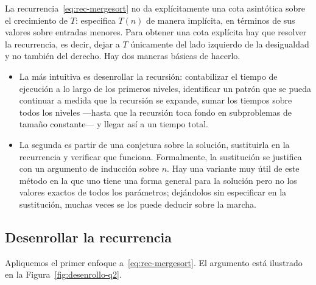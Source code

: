 \documentclass[12pt, spanish, oneside, openany]{book}
\theoremstyle{uprightplain}
\theoremstyle{definition}
\theoremstyle{remark}
\theoremstyle{definition}
\begin{document}
La recurrencia~\eqref{eq:rec-mergesort} no da explícitamente una cota asintótica sobre el crecimiento de $T$: especifica $T(n)$ de manera implícita, en términos de sus valores sobre entradas menores. Para obtener una cota explícita hay que resolver la recurrencia, es decir, dejar a $T$ únicamente del lado izquierdo de la desigualdad y no también del derecho. Hay dos maneras básicas de hacerlo.

\begin{itemize}
    \item La más intuitiva es desenrollar la recursión: contabilizar el tiempo de ejecución a lo largo de los primeros niveles, identificar un patrón que se pueda continuar a medida que la recursión se expande, sumar los tiempos sobre todos los niveles ---hasta que la recursión toca fondo en subproblemas de tamaño constante--- y llegar así a un tiempo total.

    \item La segunda es partir de una conjetura sobre la solución, sustituirla en la recurrencia y verificar que funciona. Formalmente, la sustitución se justifica con un argumento de inducción sobre $n$. Hay una variante muy útil de este método en la que uno tiene una forma general para la solución pero no los valores exactos de todos los parámetros; dejándolos sin especificar en la sustitución, muchas veces se los puede deducir sobre la marcha.
\end{itemize}

\subsection{Desenrollar la recurrencia}

Apliquemos el primer enfoque a~\eqref{eq:rec-mergesort}. El argumento está ilustrado en la Figura~\ref{fig:desenrollo-q2}.
\end{document}
